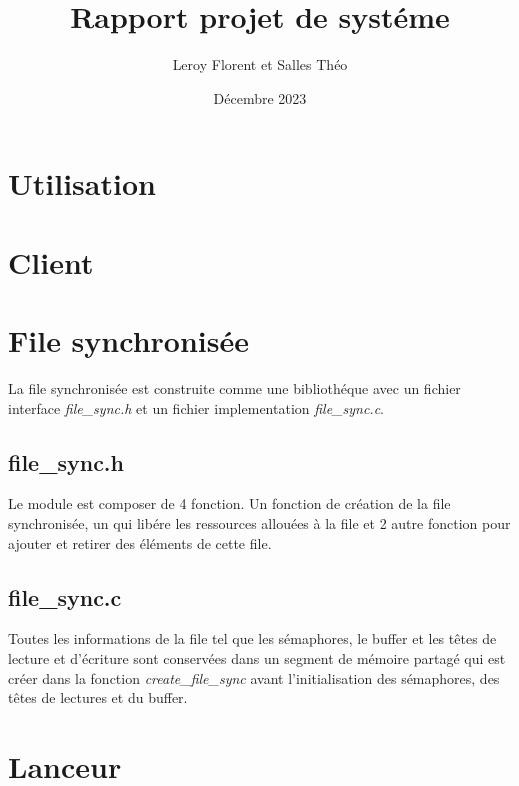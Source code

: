 \documentclass[12pt]{article}
\title{Rapport projet de systéme}
\author{Leroy Florent et Salles Théo}
\date{Décembre 2023}
\begin{document}
\maketitle
\tableofcontents
\newpage
\section{Utilisation}
\section{Client}
\section{File synchronisée}
La file synchronisée est construite comme une bibliothéque avec un fichier
interface \textit{file\_sync.h} et un fichier implementation
\textit{file\_sync.c}.
\subsection{file\_sync.h}
Le module est composer de 4 fonction. Un fonction de création de la file
synchronisée, un qui libére les ressources allouées à la file et 2 autre
fonction pour ajouter
et retirer des éléments de cette file.
\subsection{file\_sync.c}
Toutes les informations de la file tel que les sémaphores, le buffer et les têtes de lecture 
et d'écriture sont conservées dans un segment de mémoire partagé qui est créer
dans la fonction \textit{create\_file\_sync} avant l'initialisation des sémaphores, 
des têtes de lectures et du buffer.

\section{Lanceur}
\end{document}
